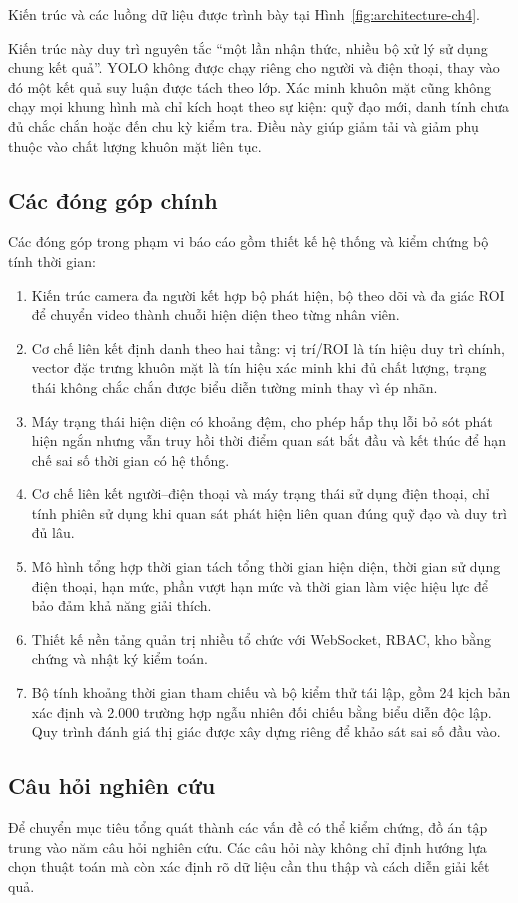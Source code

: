 Kiến trúc và các luồng dữ liệu được trình bày tại Hình~\ref{fig:architecture-ch4}.

Kiến trúc này duy trì nguyên tắc ``một lần nhận thức, nhiều bộ xử lý sử dụng chung kết quả''. YOLO không được chạy riêng cho người và điện thoại, thay vào đó một kết quả suy luận được tách theo lớp. Xác minh khuôn mặt cũng không chạy mọi khung hình mà chỉ kích hoạt theo sự kiện: quỹ đạo mới, danh tính chưa đủ chắc chắn hoặc đến chu kỳ kiểm tra. Điều này giúp giảm tải và giảm phụ thuộc vào chất lượng khuôn mặt liên tục.

\subsection{Các đóng góp chính}
Các đóng góp trong phạm vi báo cáo gồm thiết kế hệ thống và kiểm chứng bộ tính thời gian:
\begin{enumerate}
\item Kiến trúc camera đa người kết hợp bộ phát hiện, bộ theo dõi và đa giác ROI để chuyển video thành chuỗi hiện diện theo từng nhân viên.
\item Cơ chế liên kết định danh theo hai tầng: vị trí/ROI là tín hiệu duy trì chính, vector đặc trưng khuôn mặt là tín hiệu xác minh khi đủ chất lượng, trạng thái không chắc chắn được biểu diễn tường minh thay vì ép nhãn.
\item Máy trạng thái hiện diện có khoảng đệm, cho phép hấp thụ lỗi bỏ sót phát hiện ngắn nhưng vẫn truy hồi thời điểm quan sát bắt đầu và kết thúc để hạn chế sai số thời gian có hệ thống.
\item Cơ chế liên kết người--điện thoại và máy trạng thái sử dụng điện thoại, chỉ tính phiên sử dụng khi quan sát phát hiện liên quan đúng quỹ đạo và duy trì đủ lâu.
\item Mô hình tổng hợp thời gian tách tổng thời gian hiện diện, thời gian sử dụng điện thoại, hạn mức, phần vượt hạn mức và thời gian làm việc hiệu lực để bảo đảm khả năng giải thích.
\item Thiết kế nền tảng quản trị nhiều tổ chức với WebSocket, RBAC, kho bằng chứng và nhật ký kiểm toán.
\item Bộ tính khoảng thời gian tham chiếu và bộ kiểm thử tái lập, gồm 24 kịch bản xác định và 2.000 trường hợp ngẫu nhiên đối chiếu bằng biểu diễn độc lập. Quy trình đánh giá thị giác được xây dựng riêng để khảo sát sai số đầu vào.
\end{enumerate}

\subsection{Câu hỏi nghiên cứu}
Để chuyển mục tiêu tổng quát thành các vấn đề có thể kiểm chứng, đồ án tập trung vào năm câu hỏi nghiên cứu. Các câu hỏi này không chỉ định hướng lựa chọn thuật toán mà còn xác định rõ dữ liệu cần thu thập và cách diễn giải kết quả.

